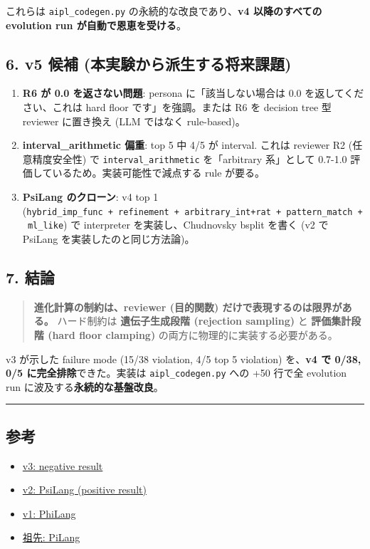 \documentclass[
]{ltjsarticle}
\providecommand{\tightlist}{%
  \setlength{\itemsep}{0pt}\setlength{\parskip}{0pt}}
\begin{document}
これらは \texttt{aipl\_codegen.py} の永続的な改良であり、\textbf{v4
以降のすべての evolution run が自動で恩恵を受ける}。

\subsection{6. v5 候補
(本実験から派生する将来課題)}\label{v5-ux5019ux88dc-ux672cux5b9fux9a13ux304bux3089ux6d3eux751fux3059ux308bux5c06ux6765ux8ab2ux984c}

\begin{enumerate}
\def\labelenumi{\arabic{enumi}.}
\tightlist
\item
  \textbf{R6 が 0.0 を返さない問題}: persona に「該当しない場合は 0.0
  を返してください、これは hard floor です」を強調。または R6 を
  decision tree 型 reviewer に置き換え (LLM ではなく rule-based)。
\item
  \textbf{interval\_arithmetic 偏重}: top 5 中 4/5 が interval. これは
  reviewer R2 (任意精度安全性) で \texttt{interval\_arithmetic}
  を「arbitrary 系」として 0.7-1.0
  評価しているため。実装可能性で減点する rule が要る。
\item
  \textbf{PsiLang のクローン}: v4 top 1
  (\texttt{hybrid\_imp\_func\ +\ refinement\ +\ arbitrary\_int+rat\ +\ pattern\_match\ +\ ml\_like})
  で interpreter を実装し、Chudnovsky bsplit を書く (v2 で PsiLang
  を実装したのと同じ方法論)。
\end{enumerate}

\subsection{7. 結論}\label{ux7d50ux8ad6}

\begin{quote}
\textbf{進化計算の制約は、reviewer (目的関数)
だけで表現するのは限界がある。} ハード制約は \textbf{遺伝子生成段階
(rejection sampling)} と \textbf{評価集計段階 (hard floor clamping)}
の両方に物理的に実装する必要がある。
\end{quote}

v3 が示した failure mode (15/38 violation, 4/5 top 5 violation)
を、\textbf{v4 で 0/38, 0/5 に完全排除}できた。実装は
\texttt{aipl\_codegen.py} への +50 行で全 evolution run
に波及する\textbf{永続的な基盤改良}。

\begin{center}\rule{0.5\linewidth}{0.5pt}\end{center}

\subsection{参考}\label{ux53c2ux8003}

\begin{itemize}
\tightlist
\item
  \href{../2026-05-16_v3_langdesign/REPORT.md}{v3: negative result}
\item
  \href{../2026-05-16_v2_langdesign/REPORT.md}{v2: PsiLang (positive
  result)}
\item
  \href{../2026-05-16_robustness_v1/REPORT.md}{v1: PhiLang}
\item
  \href{../../REPORT_JA.md}{祖先: PiLang}
\end{itemize}
\end{document}
